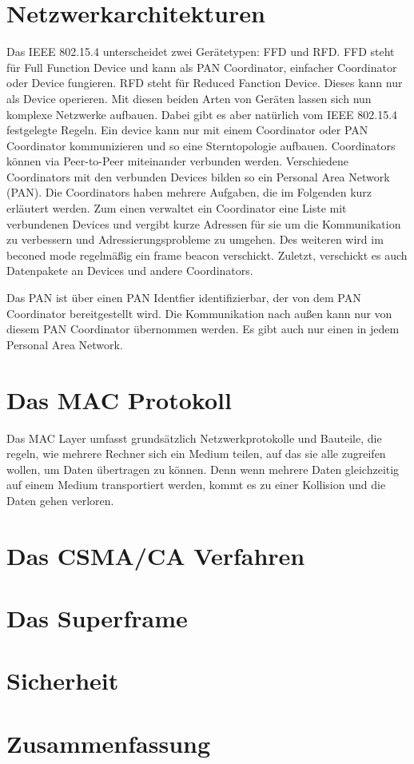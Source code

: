 \documentclass[a4paper, 12pt]{scrreprt}
\begin{document}
\chapter{Netzwerkarchitekturen}
Das IEEE 802.15.4 unterscheidet zwei Gerätetypen: FFD und RFD.
FFD steht für Full Function Device und kann als PAN Coordinator, einfacher Coordinator oder Device fungieren.
RFD steht für Reduced Fanction Device. Dieses kann nur als Device operieren.
Mit diesen beiden Arten von Geräten lassen sich nun komplexe Netzwerke aufbauen. Dabei gibt es aber natürlich vom IEEE 802.15.4 festgelegte Regeln.
Ein device kann nur mit einem Coordinator oder PAN Coordinator kommunizieren und so eine Sterntopologie aufbauen. Coordinators können via Peer-to-Peer miteinander verbunden werden. Verschiedene Coordinators mit den verbunden Devices bilden so ein Personal Area Network (PAN).
Die Coordinators haben mehrere Aufgaben, die im Folgenden kurz erläutert werden.
Zum einen verwaltet ein Coordinator eine Liste mit verbundenen Devices und vergibt kurze Adressen für sie um die Kommunikation zu verbessern und Adressierungsprobleme zu umgehen.
Des weiteren wird im beconed mode regelmäßig ein frame beacon verschickt. Zuletzt, verschickt es auch Datenpakete an Devices und andere Coordinators.

Das PAN ist über einen PAN Identfier identifizierbar, der von dem PAN Coordinator bereitgestellt wird. Die Kommunikation nach außen kann nur von diesem PAN Coordinator übernommen werden. Es gibt auch nur einen in jedem Personal Area Network. 



\chapter{Das MAC Protokoll}
Das MAC Layer umfasst grundsätzlich Netzwerkprotokolle und Bauteile, die regeln, wie mehrere Rechner sich ein Medium teilen, auf das sie alle zugreifen wollen, um Daten übertragen zu können. Denn wenn mehrere Daten gleichzeitig auf einem Medium transportiert werden, kommt es zu einer Kollision und die Daten gehen verloren.

\chapter{Das CSMA/CA Verfahren}

\chapter{Das Superframe}

\chapter{Sicherheit}

\chapter{Zusammenfassung}



\newpage

\end{document}

